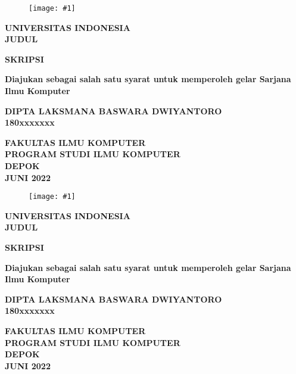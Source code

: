 \newcommand{\titlepagetemplate}[1]{
    \begin{center}
        \begin{figure}[ht]
            \centering
            \texttt{[image: \#1]}
        \end{figure}
        \large
        \textbf{UNIVERSITAS INDONESIA}\\
        \bigskip
        \textbf{JUDUL}
            
        \vspace{3cm}
        
        \large
        \textbf{SKRIPSI}
        
        \textbf{Diajukan sebagai salah satu syarat untuk memperoleh gelar Sarjana Ilmu
        Komputer}
        
        
        \vspace{4cm}
        
        \large
        \textbf{DIPTA LAKSMANA BASWARA DWIYANTORO}\\
        \textbf{180xxxxxxx}
        
        \vspace{5cm}
        
        \large
        \textbf{FAKULTAS ILMU KOMPUTER}\\
        \textbf{PROGRAM STUDI ILMU KOMPUTER}\\
        \textbf{DEPOK}\\
        \textbf{JUNI 2022}
            
    \end{center}
}

\begin{titlepage}
    \titlepagetemplate{attachment/Makara_UI.png}
\end{titlepage}
\begin{titlepage}
    \titlepagetemplate{attachment/Makara_UI_black.png}
    \setcounter{page}{2}
\end{titlepage}